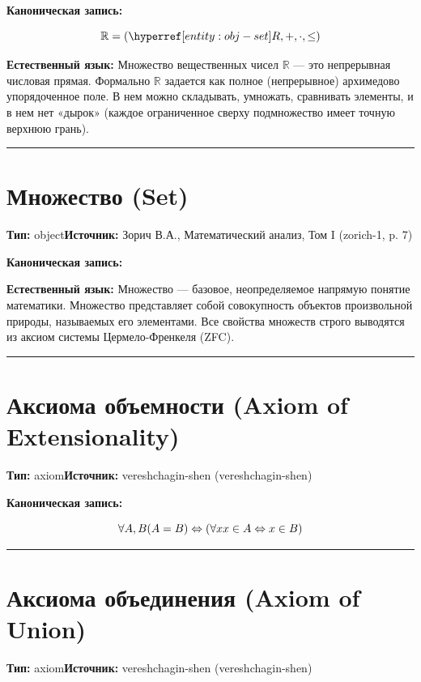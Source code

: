 \documentclass{report}
\begin{document}
\textbf{Каноническая запись:}

\begin{object}



\[ \mathbb{R} = (\entityref{obj-set}{R}, +, \cdot, \leq) \]
\end{object}


\textbf{Естественный язык:}
Множество вещественных чисел $\mathbb{R}$ — это непрерывная числовая прямая. Формально $\mathbb{R}$ задается как полное (непрерывное) архимедово упорядоченное поле. В нем можно складывать, умножать, сравнивать элементы, и в нем нет «дырок» (каждое ограниченное сверху подмножество имеет точную верхнюю грань).

\vspace{1em}
\hrule
\vspace{1em}

\section{Множество (Set)}\label{entity:obj-set}
\textbf{Тип:} object\quad \textbf{Источник:} Зорич В.А., Математический анализ, Том I (zorich-1, p. 7)

\textbf{Каноническая запись:}




\textbf{Естественный язык:}
Множество — базовое, неопределяемое напрямую понятие математики. Множество представляет собой совокупность объектов произвольной природы, называемых его элементами. Все свойства множеств строго выводятся из аксиом системы Цермело-Френкеля (ZFC).

\vspace{1em}
\hrule
\vspace{1em}

\section{Аксиома объемности (Axiom of Extensionality)}\label{entity:axm-zfc-extensionality}
\textbf{Тип:} axiom\quad \textbf{Источник:} vereshchagin-shen (vereshchagin-shen)

\textbf{Каноническая запись:}

\[
\forall{A, B}
(A = B) \Leftrightarrow (\forall{x} x \in A \Leftrightarrow x \in B)
\]


\vspace{1em}
\hrule
\vspace{1em}

\section{Аксиома объединения (Axiom of Union)}\label{entity:axm-zfc-union}
\textbf{Тип:} axiom\quad \textbf{Источник:} vereshchagin-shen (vereshchagin-shen)
\end{document}
